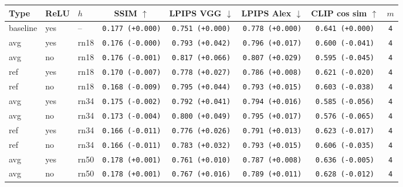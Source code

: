 \begin{tabular}{|l|l|l|c|c|c|c|c|}
\hline
Type & ReLU & $h$ & SSIM $\uparrow$ & LPIPS VGG $\downarrow$ & LPIPS Alex $\downarrow$ & CLIP cos sim $\uparrow$ & $m$ \\
\hline
\rowcolor{verylightgray}baseline & yes & -- & \texttt{0.177 {\color{black}(+0.000)}} & \texttt{0.751 {\color{black}(+0.000)}} & \texttt{0.778 {\color{black}(+0.000)}} & \texttt{0.641 {\color{black}(+0.000)}} & \texttt{4} \\
\hline
avg & yes & rn18 & \texttt{0.176 {\color{black}(-0.000)}} & \texttt{0.793 {\color{red}(+0.042)}} & \texttt{0.796 {\color{red}(+0.017)}} & \texttt{0.600 {\color{red}(-0.041)}} & \texttt{4} \\
avg & no & rn18 & \texttt{0.176 {\color{red}(-0.001)}} & \texttt{0.817 {\color{red}(+0.066)}} & \texttt{0.807 {\color{red}(+0.029)}} & \texttt{0.595 {\color{red}(-0.045)}} & \texttt{4} \\
ref & yes & rn18 & \texttt{0.170 {\color{red}(-0.007)}} & \texttt{0.778 {\color{red}(+0.027)}} & \texttt{0.786 {\color{red}(+0.008)}} & \texttt{0.621 {\color{red}(-0.020)}} & \texttt{4} \\
ref & no & rn18 & \texttt{0.168 {\color{red}(-0.009)}} & \texttt{0.795 {\color{red}(+0.044)}} & \texttt{0.793 {\color{red}(+0.015)}} & \texttt{0.603 {\color{red}(-0.038)}} & \texttt{4} \\
\hline
avg & yes & rn34 & \texttt{0.175 {\color{red}(-0.002)}} & \texttt{0.792 {\color{red}(+0.041)}} & \texttt{0.794 {\color{red}(+0.016)}} & \texttt{0.585 {\color{red}(-0.056)}} & \texttt{4} \\
avg & no & rn34 & \texttt{0.173 {\color{red}(-0.004)}} & \texttt{0.800 {\color{red}(+0.049)}} & \texttt{0.795 {\color{red}(+0.017)}} & \texttt{0.576 {\color{red}(-0.065)}} & \texttt{4} \\
ref & yes & rn34 & \texttt{0.166 {\color{red}(-0.011)}} & \texttt{0.776 {\color{red}(+0.026)}} & \texttt{0.791 {\color{red}(+0.013)}} & \texttt{0.623 {\color{red}(-0.017)}} & \texttt{4} \\
ref & no & rn34 & \texttt{0.166 {\color{red}(-0.011)}} & \texttt{0.783 {\color{red}(+0.032)}} & \texttt{0.793 {\color{red}(+0.015)}} & \texttt{0.606 {\color{red}(-0.035)}} & \texttt{4} \\
\hline
avg & yes & rn50 & \texttt{0.178 {\color{green}(+0.001)}} & \texttt{0.761 {\color{red}(+0.010)}} & \texttt{0.787 {\color{red}(+0.008)}} & \texttt{0.636 {\color{red}(-0.005)}} & \texttt{4} \\
avg & no & rn50 & \texttt{0.178 {\color{green}(+0.001)}} & \texttt{0.767 {\color{red}(+0.016)}} & \texttt{0.789 {\color{red}(+0.011)}} & \texttt{0.628 {\color{red}(-0.012)}} & \texttt{4} \\

\end{tabular}
